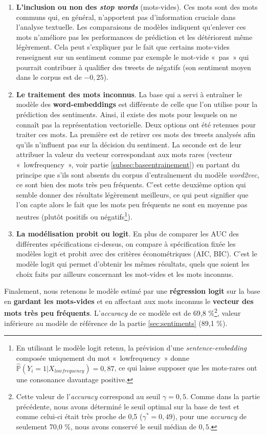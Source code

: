 \documentclass[11pt,french,french]{article}
\let\rmarkdownfootnote\footnote%
\def\footnote{\protect\rmarkdownfootnote}
\begin{document}
\begin{enumerate}
\item \textbf{L’inclusion ou non des \emph{stop words}} (mots-vides). 
Ces mots sont des mots communs qui, en général, n’apportent pas d’information cruciale dans l’analyse textuelle. Les comparaisons de modèles indiquent qu’enlever ces mots n’améliore pas les performances de prédiction et les détériorent même légèrement. Cela peut s’expliquer par le fait que certains mots-vides renseignent sur un sentiment comme par exemple le mot-vide « pas » qui pourrait contribuer à qualifier des tweets de négatifs (son sentiment moyen dans le corpus est de $-0,25$).

\item \textbf{Le traitement des mots inconnus}. La base qui a servi à entraîner le modèle des \textbf{word-embeddings} est différente de celle que l'on utilise pour la prédiction des sentiments.
Ainsi, il existe des mots pour lesquels on ne connaît pas la représentation vectorielle. 
Deux options ont été retenues pour traiter ces mots. 
La première est de retirer ces mots des tweets analysés afin qu'ils n’influent pas sur la décision du sentiment. 
La seconde est de leur attribuer la valeur du vecteur correspondant aux mots rares (vecteur « lowfrequency », voir partie \ref{subsec:baseentrainement}) en partant du principe que s'ils sont absents du corpus d'entraînement du modèle \emph{word2vec}, ce sont bien des mots très peu fréquents. 
C’est cette deuxième option qui semble donner des résultats légèrement meilleurs, ce qui peut signifier que l’on capte alors le fait que les mots peu fréquents ne sont en moyenne pas neutres (plutôt positifs ou négatifs\footnote{En utilisant le modèle logit retenu, la prévision d'une \emph{sentence-embedding} composée uniquement du mot « lowfrequency » donne $\widehat{\mathbb{P}}(Y_i = 1 | X_{lowfrequency}) = 0,87$, ce qui laisse supposer que les mots-rares ont une consonance davantage positive.}). 

\item \textbf{La modélisation probit ou logit}. En plus de comparer les AUC des différentes spécifications ci-dessus,  on compare à spécification fixée les modèles logit et probit avec des critères économétriques (AIC, BIC). C’est le modèle logit qui permet d’obtenir les mêmes résultats, quels que soient les choix faits par ailleurs concernant les mot-vides et les mots inconnus.

\end{enumerate}

Finalement, nous retenons le modèle estimé par une \textbf{régression logit} sur la base en \textbf{gardant les mots-vides} et en affectant aux mots inconnus le \textbf{vecteur des mots très peu fréquents}. L'\emph{accuracy} de ce modèle est de 69,8 \%\footnote{Cette valeur de l'\emph{accuracy} correspond au seuil \(\gamma = 0,5\). Comme dans la partie précédente, nous avons déterminé le seuil optimal sur la base de test et comme celui-ci était très proche de 0,5 (\(\gamma^* = 0,49\)), pour une \emph{accuracy} de seulement 70,0 \%, nous avons conservé le seuil médian de \(0,5\).}, valeur inférieure au modèle de référence de la partie \ref{sec:sentiments} (89,1 \%).
\end{document}
